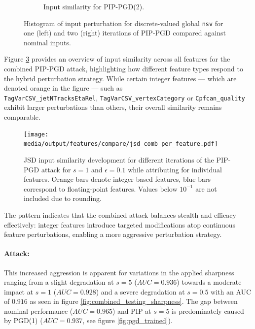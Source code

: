 \begin{figure}[htbp]
\begin{subfigure}[t]{0.5\textwidth}
    \caption{Input similarity for PIP-PGD(2).}
    \label{fig:middle}
  \end{subfigure}\hfill

  \caption{Histogram of input perturbation for discrete-valued global \texttt{nsv} for one (left) and two (right) iterations of PIP-PGD compared against nominal inputs.}
  \label{fig:combined_input_vtxAss}
\end{figure}

Figure \ref{fig:combined_joint_overview} provides an overview of input similarity across all features for the combined PIP-PGD attack, highlighting how different feature types respond to the hybrid perturbation strategy. While certain integer features — which are denoted orange in the figure — such as \\ \texttt{TagVarCSV\_jetNTracksEtaRel}, \texttt{TagVarCSV\_vertexCategory} or \texttt{Cpfcan\_quality} exhibit larger perturbations than others, their overall similarity remains comparable.


\begin{figure}[H]
\centering
    \texttt{[image: media/output/features/compare/jsd\_comb\_per\_feature.pdf]}
    \caption{JSD input similarity development for different iterations of the PIP-PGD attack for $s=1$ and $\epsilon=0.1$ while attributing for individual features. Orange bars denote integer based features, blue bars correspond to floating-point features. Values below $10^{-1}$ are not included due to rounding.}
    \label{fig:combined_joint_overview}
\end{figure}

The pattern indicates that the combined attack balances stealth and efficacy effectively: integer features introduce targeted modifications atop continuous feature perturbations, enabling a more aggressive perturbation strategy. 

\paragraph{Attack:} This increased aggression is apparent for variations in the applied sharpness ranging from a slight degradation at $s=5$ ($AUC=0.936$) towards a moderate impact at $s=1$ ($AUC=0.928$) and a severe degradation at $s=0.5$ with an AUC of $0.916$  as seen in figure \ref{fig:combined_testing_sharpness}. The gap between nominal performance ($AUC=0.965$) and PIP at $s=5$ is predominately caused by PGD(1) ($AUC=0.937$, see figure \ref{fig:pgd_trained}).


